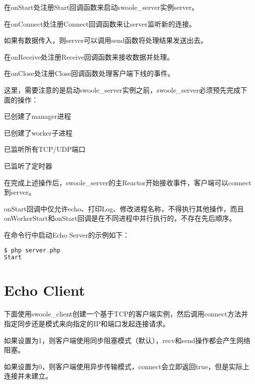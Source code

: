 \begin{compactitem}
\item 在onStart处注册Start回调函数来启动swoole\_server实例server。
\item 在onConnect处注册Connect回调函数来让server监听新的连接。

如果有数据传入，则server可以调用send函数将处理结果发送出去。

\item 在onReceive处注册Receive回调函数来接收数据并处理。
\item 在onClose处注册Close回调函数处理客户端下线的事件。
\end{compactitem}

这里，需要注意的是启动swoole\_server实例之前，swoole\_server必须预先完成下面的操作：

\begin{compactitem}
\item 已创建了manager进程
\item 已创建了worker子进程
\item 已监听所有TCP/UDP端口
\item 已监听了定时器
\end{compactitem}

在完成上述操作后，swoole\_server的主Reactor开始接收事件，客户端可以connect到server。

onStart回调中仅允许echo、打印Log、修改进程名称，不得执行其他操作，而且onWorkerStart和onStart回调是在不同进程中并行执行的，不存在先后顺序。

在命令行中启动Echo Server的示例如下：

\begin{lstlisting}[language=PHP]
$ php server.php
Start
\end{lstlisting}

\section{Echo Client}

下面使用swoole\_client创建一个基于TCP的客户端实例，然后调用connect方法并指定同步还是模式来向指定的IP和端口发起连接请求。

\begin{compactitem}
\item 如果设置为1，则客户端使用同步阻塞模式（默认），recv和send操作都会产生网络阻塞。
\item 如果设置为0，则客户端使用异步传输模式，connect会立即返回true，但是实际上连接并未建立。
\end{compactitem}

